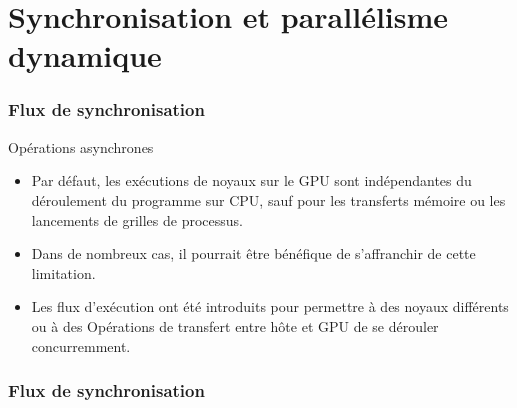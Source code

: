 \section{Synchronisation et parallélisme dynamique}
\begin{frame}
    \frametitle{Flux de synchronisation}
\begin{block}{Opérations asynchrones}
    \begin{itemize}
        \item<+-> Par défaut, les exécutions de noyaux sur le GPU sont indépendantes du déroulement
        du programme sur CPU, sauf pour les transferts mémoire ou les lancements de grilles de processus.
        \item<+-> Dans de nombreux cas, il pourrait être bénéfique de s'affranchir de cette limitation.
        \item<+-> Les flux d'exécution ont été introduits pour permettre à des noyaux différents ou à des Opérations
        de transfert entre hôte et GPU de se dérouler concurremment. 
    \end{itemize}
\end{block}
\end{frame}
\begin{frame}
    \frametitle{Flux de synchronisation}
\end{frame}